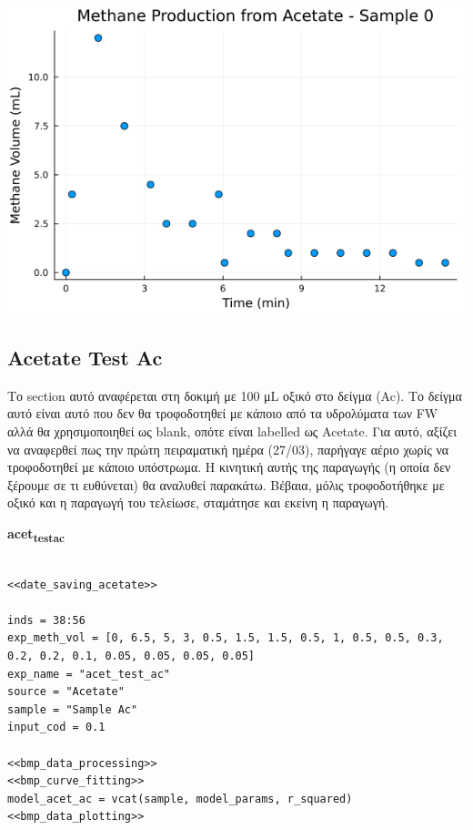 \documentclass[11pt]{article}
\begin{document}
\begin{center}
\includegraphics[width=.9\linewidth]{../plots/BMPs/Acetate/acet_test_0_min.png}
\end{center}


\subsection{Acetate Test Ac}
\label{sec:orgf41151c}
Το section αυτό αναφέρεται στη δοκιμή με 100 μL οξικό στο δείγμα (Ac). Το δείγμα αυτό είναι αυτό που δεν θα τροφοδοτηθεί με κάποιο από τα υδρολύματα των FW αλλά θα χρησιμοποιηθεί ως blank, οπότε είναι labelled ως Acetate. Για αυτό, αξίζει να αναφερθεί πως την πρώτη πειραματική ημέρα (27/03), παρήγαγε αέριο χωρίς να τροφοδοτηθεί με κάποιο υπόστρωμα. Η κινητική αυτής της παραγωγής (η οποία δεν ξέρουμε σε τι ευθύνεται) θα αναλυθεί παρακάτω. Βέβαια, μόλις τροφοδοτήθηκε με οξικό και η παραγωγή του τελείωσε, σταμάτησε και εκείνη η παραγωγή.

\textbf{acet\textsubscript{test}\textsubscript{ac}}
\begin{verbatim}

<<date_saving_acetate>>

inds = 38:56
exp_meth_vol = [0, 6.5, 5, 3, 0.5, 1.5, 1.5, 0.5, 1, 0.5, 0.5, 0.3, 0.2, 0.2, 0.1, 0.05, 0.05, 0.05, 0.05]
exp_name = "acet_test_ac"
source = "Acetate"
sample = "Sample Ac"
input_cod = 0.1

<<bmp_data_processing>>
<<bmp_curve_fitting>>
model_acet_ac = vcat(sample, model_params, r_squared)
<<bmp_data_plotting>>
\end{verbatim}
\end{document}
